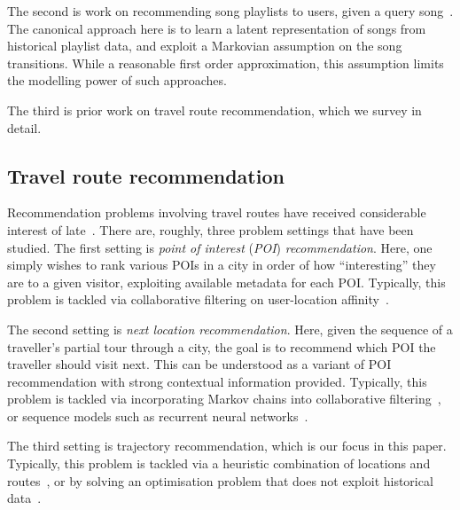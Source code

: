 The second is work on recommending song playlists to users, given a query song~\citep{McFee:2011,chen2012playlist}.
The canonical approach here is to 
learn a latent representation of songs from historical playlist data,
and exploit a Markovian assumption on the song transitions.
While a reasonable first order approximation, this assumption limits the modelling power of such approaches.

The third is prior work on travel route recommendation, which we survey in detail.


%
\subsection{Travel route recommendation}

Recommendation problems involving travel routes have received considerable interest of late~\cite{bao2015recommendations,zheng2015trajectory,zheng2014urban}.
There are, roughly, three problem settings that have been studied.
The first setting is \emph{point of interest} (\emph{POI}) \emph{recommendation}.
Here, one simply wishes to rank various POIs in a city in order of how ``interesting'' they are to a given visitor,
exploiting
available metadata for each POI.
Typically, this problem is tackled via 
collaborative filtering on user-location affinity~\cite{shi2011personalized,lian2014geomf,liu2014exploiting,yuan2013timeaware,hsieh2014mining,gao2013temporal,yuan2014graph}.

The second setting is \emph{next location recommendation}.
Here, given the sequence of a traveller's partial tour through a city,
the goal is to recommend which POI the traveller should visit next.
This can be understood as a variant of POI recommendation with strong contextual information provided.
Typically, this problem is tackled via 
incorporating Markov chains into collaborative filtering~\cite{fpmc10,ijcai13,zhang2015location},
or sequence models such as recurrent neural networks~\cite{aaai16}.

The third setting is trajectory recommendation,
which is our focus in this paper.
Typically, this problem is tackled via 
a heuristic combination of locations and routes~\cite{lu2010photo2trip,ijcai15,lu2012personalized}, or
by solving an optimisation problem that does not exploit historical data~\cite{gioniswsdm14,chen2015tripplanner}.


